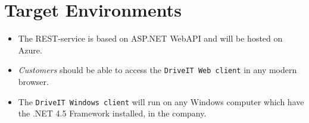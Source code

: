 \section{Target Environments}
\begin{itemize}
	\item The REST-service is based on ASP.NET WebAPI and will be hosted on Azure.
	\item \emph{Customers} should be able to access the \texttt{DriveIT Web client} in any modern browser.
	\item The \texttt{DriveIT Windows client} will run on any Windows computer which have the .NET 4.5 Framework installed, in the company.
\end{itemize}
